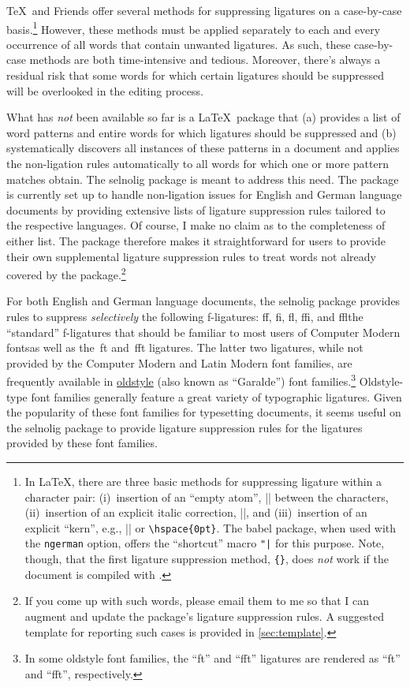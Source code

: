 \documentclass[11pt]{article}
\newcommand{\pkg}[1]{\textsf{#1}}
\newcommand{\opt}[1]{\texttt{#1}}
\begin{document}
\TeX\ and Friends offer several methods for suppressing ligatures on a case-by-case basis.\footnote{In \LaTeX, there are three basic methods for suppressing ligature within a character pair: (i)~insertion of an \enquote{empty atom}, |{}| between the characters, (ii)~insertion of an explicit italic correction, |\/|, and (iii)~insertion of an explicit \enquote{kern}, e.g., |\kern0pt| or \Verb/\hspace{0pt}/. The \pkg{babel} package, when used with the \opt{ngerman} option, offers the \enquote{shortcut} macro \Verb/"|/ for this purpose. Note, though, that the first ligature suppression method, \Verb/{}/, does \emph{not} work if the document is compiled with \LuaLaTeX.} However, these methods must be applied separately to each and every occurrence of all words that contain unwanted ligatures. As such, these case-by-case methods are both time-intensive and tedious. Moreover, there's always a residual risk that some words for which certain ligatures should be suppressed will be overlooked in the editing process. 

What has \emph{not} been available so far is a \LaTeX\ package that (a) provides a list of word patterns and entire words for which ligatures should be suppressed and (b) systematically discovers all instances of these patterns in a document and applies the non-ligation rules automatically to all words for which one or more pattern matches obtain. The \pkg{selnolig} package is meant to address this need. The package is currently set up to handle non-ligation issues for English and German language documents by providing extensive lists of ligature suppression rules tailored to the respective languages. Of course, I make no claim as to the completeness of either list. The package therefore makes it straightforward for users to provide their own supplemental ligature suppression rules to treat words not already covered by the package.\footnote{If you come up with such words, please email them to me so that I can augment and update the package's ligature suppression rules. A suggested template for reporting such cases is provided in \cref{sec:template}.} 

For both English and German language documents, the \pkg{selnolig} package provides rules to suppress \emph{selectively} the following f-ligatures: ff, fi, fl, ffi, and ffl\textemdash the \enquote{standard} f-ligatures that should be familiar to most users of Computer Modern fonts\textemdash as well as the~ft and~fft ligatures. The latter two ligatures, while not provided by the Computer Modern and Latin Modern font families, are frequently available in \href{http://en.wikipedia.org/wiki/Serif#Old_Style}{oldstyle} (also known as \enquote{Garalde}) font families.\footnote{In some oldstyle font families, the \enquote{ft} and \enquote{fft} ligatures are rendered as \enquote{\sabon ft} and \enquote{\sabon fft}, respectively.} Oldstyle-type font families generally feature a great variety of typographic ligatures. Given the popularity of these font families for typesetting documents, it seems useful on the \pkg{selnolig} package to provide ligature suppression rules for the ligatures provided by these font families.
\end{document}
